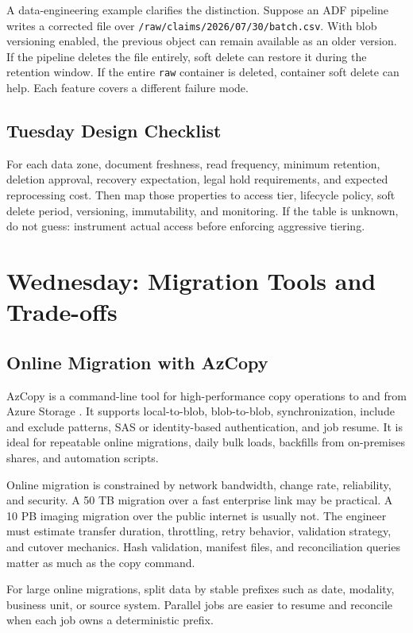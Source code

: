 A data-engineering example clarifies the distinction. Suppose an ADF pipeline writes a corrected file over \texttt{/raw/claims/2026/07/30/batch.csv}. With blob versioning enabled, the previous object can remain available as an older version. If the pipeline deletes the file entirely, soft delete can restore it during the retention window. If the entire \texttt{raw} container is deleted, container soft delete can help. Each feature covers a different failure mode.

\subsection{Tuesday Design Checklist}
For each data zone, document freshness, read frequency, minimum retention, deletion approval, recovery expectation, legal hold requirements, and expected reprocessing cost. Then map those properties to access tier, lifecycle policy, soft delete period, versioning, immutability, and monitoring. If the table is unknown, do not guess: instrument actual access before enforcing aggressive tiering.

\section{Wednesday: Migration Tools and Trade-offs}

\subsection{Online Migration with AzCopy}
AzCopy is a command-line tool for high-performance copy operations to and from Azure Storage \cite{microsoft2025azcopy}. It supports local-to-blob, blob-to-blob, synchronization, include and exclude patterns, SAS or identity-based authentication, and job resume. It is ideal for repeatable online migrations, daily bulk loads, backfills from on-premises shares, and automation scripts.

Online migration is constrained by network bandwidth, change rate, reliability, and security. A 50 TB migration over a fast enterprise link may be practical. A 10 PB imaging migration over the public internet is usually not. The engineer must estimate transfer duration, throttling, retry behavior, validation strategy, and cutover mechanics. Hash validation, manifest files, and reconciliation queries matter as much as the copy command.

\begin{tipbox}
For large online migrations, split data by stable prefixes such as date, modality, business unit, or source system. Parallel jobs are easier to resume and reconcile when each job owns a deterministic prefix.
\end{tipbox}

